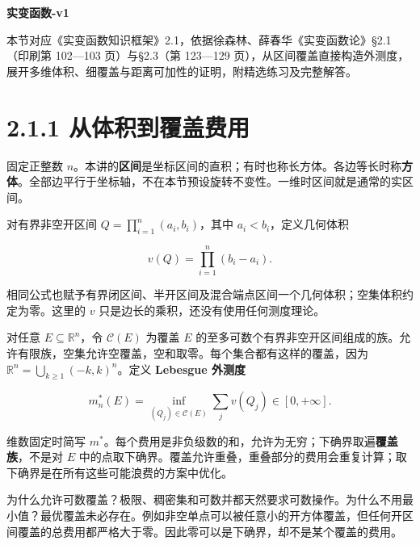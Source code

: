 \documentclass[11pt,a4paper]{article}
\begin{document}
\begin{center}
{\Large\bfseries 实变函数-v1\par}
\vspace{7pt}{\large 2.1 Lebesgue 外测度\par}
\vspace{5pt}{第二章 Lebesgue 测度\par}
\end{center}
本节对应《实变函数知识框架》2.1，依据徐森林、薛春华《实变函数论》\S2.1（印刷第 102—103 页）与\S2.3（第 123—129 页），从区间覆盖直接构造外测度，展开多维体积、细覆盖与距离可加性的证明，附精选练习及完整解答。
\begingroup\setlength{\parskip}{0pt}\tableofcontents\endgroup

\section[\S{}2.1.1
从体积到覆盖费用]{2.1.1
从体积到覆盖费用}\label{ux4eceux4f53ux79efux5230ux8986ux76d6ux8d39ux7528}

固定正整数
\(n\)。本讲的\textbf{区间}是坐标区间的直积；有时也称长方体。各边等长时称\textbf{方体}。全部边平行于坐标轴，不在本节预设旋转不变性。一维时区间就是通常的实区间。

对有界非空开区间 \(Q=\prod_{i=1}^n(a_i,b_i)\)，其中
\(a_i<b_i\)，定义几何体积

\begin{equation*}
v(Q)=\prod_{i=1}^n(b_i-a_i).
\tag{2.1.1}
\end{equation*}

相同公式也赋予有界闭区间、半开区间及混合端点区间一个几何体积；空集体积约定为零。这里的
\(v\) 只是边长的乘积，还没有使用任何测度理论。

对任意 \(E\subseteq\mathbb R^n\)，令 \(\mathcal C(E)\) 为覆盖 \(E\)
的至多可数个有界非空开区间组成的族。允许有限族，空集允许空覆盖，空和取零。每个集合都有这样的覆盖，因为
\(\mathbb R^n=\bigcup_{k\ge1}(-k,k)^n\)。定义 \textbf{Lebesgue 外测度}

\begin{equation*}
m_n^*(E)=\inf_{(Q_j)\in\mathcal C(E)}\sum_jv(Q_j)\in[0,+\infty].
\tag{2.1.2}
\end{equation*}

维数固定时简写
\(m^*\)。每个费用是非负级数的和，允许为无穷；下确界取遍\textbf{覆盖族}，不是对
\(E\)
中的点取下确界。覆盖允许重叠，重叠部分的费用会重复计算；取下确界是在所有这些可能浪费的方案中优化。

为什么允许可数覆盖？极限、稠密集和可数并都天然要求可数操作。为什么不用最小值？最优覆盖未必存在。例如非空单点可以被任意小的开方体覆盖，但任何开区间覆盖的总费用都严格大于零。因此零可以是下确界，却不是某个覆盖的费用。
\end{document}
